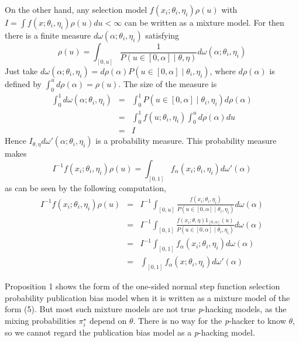 On the other hand, any selection model $f(x_{i};\theta_{i},\eta_{i})\rho(u)$ with $I =\int f(x;\theta_{i},\eta_{i})\rho(u)du<\infty$ can be written as a mixture model. For then there is a finite measure $d\omega(\alpha;\theta_{i},\eta_{i})$ satisfying 
\[
\rho(u)=\int_{[0,u]}\frac{1}{P(u\in\left[0,\alpha\right]\mid\theta,\eta)}d\omega(\alpha;\theta_{i},\eta_{i})
\]
Just take $d\omega(\alpha;\theta_{i},\eta_{i})=d\rho(\alpha)P(u\in\left[0,\alpha\right]\mid\theta_{i},\eta_{i})$, where $d\rho(\alpha)$ is defined by $\int_{0}^{u}d\rho(\alpha)=\rho(u)$. The size of the measure is
\begin{eqnarray*}
\int_{0}^{1}d\omega(\alpha;\theta_{i},\eta_{i}) & = & \int_{0}^{1}P(u\in\left[0,\alpha\right]\mid\theta_{i},\eta_{i})d\rho(\alpha)\\
 & = & \int_{0}^{1}f(u;\theta_{i},\eta_{i})\int_{0}^{u}d\rho(\alpha)du\\
 & = & I
\end{eqnarray*}
Hence $I_{\theta,\eta}d\omega'(\alpha;\theta_{i},\eta_{i})$ is a probability measure. This probability measure makes 
\[
I^{-1}f(x_{i};\theta_{i},\eta_{i})\rho(u)=\int_{[0,1]}f_\alpha(x_{i};\theta_{i},\eta_{i})d\omega'(\alpha)
\]
as can be seen by the following computation,
\begin{eqnarray*}
I^{-1}f(x_{i};\theta_{i},\eta_{i})\rho(u) & = & I^{-1}\int_{[0,u]}\frac{f(x_{i};\theta_{i},\eta_{i})}{P(u\in\left[0,\alpha\right]\mid\theta_{i},\eta_{i})}d\omega(\alpha)\\
 & = & I^{-1}\int_{[0,1]}\frac{f(x_{i};\theta,\eta)1_{\left[0,\alpha\right]}(u)}{P(u\in\left[0,\alpha\right]\mid\theta_{i},\eta_{i})}d\omega(\alpha)\\
 & = & I^{-1}\int_{[0,1]}f_\alpha(x_{i};\theta_{i},\eta_{i})d\omega(\alpha)\\
 & = & \int_{[0,1]}f_\alpha(x;\theta_{i},\eta_{i})d\omega'(\alpha)
\end{eqnarray*}

Proposition 1 shows the form of the one-sided normal step function selection probability publication bias model when it is written as a mixture model of the form (5). But most such mixture models are not true \textit{p}-hacking models, as the mixing probabilities $\pi_{i}^{\star}$ depend on $\theta$. There is no way for the \textit{p}-hacker to know
$\theta$, so we cannot regard the publication bias model as a \textit{p}-hacking model.

